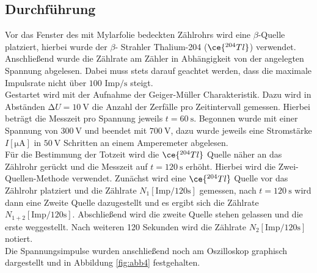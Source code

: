\subsection{Durchführung}
Vor das Fenster des mit Mylarfolie bedeckten Zählrohrs wird eine $\beta$-Quelle platziert, hierbei wurde der $\beta$- Strahler Thalium-204 ($\ce{^{204}_{}Tl}$) verwendet. Anschließend wurde die Zählrate
am Zähler in Abhängigkeit von der angelegten Spannung abgelesen. Dabei muss stets darauf geachtet werden, dass die maximale Impulsrate nicht über $100$ $\text{Imp}/{\si{\second}}$ steigt. %
\newline
\\
Gestartet wird mit der Aufnahme der Geiger-Müller Charakteristik. Dazu wird in Abständen $\increment U = \SI{10}{\volt}$ die Anzahl der Zerfälle pro Zeitintervall gemessen. Hierbei beträgt die
Messzeit pro Spannung jeweils $t = \SI{60}{\second}$.
Begonnen wurde mit einer Spannung
von $\SI{300}{\volt}$ und beendet mit $\SI{700}{\volt}$, dazu wurde jeweils eine Stromstärke $I [\si{\micro\ampere}]$ in $\SI{50}{\volt}$ Schritten an einem Amperemeter abgelesen. 
\newline
\\
Für die Bestimmung der Totzeit wird die $\ce{^{204}_{}Tl}$ Quelle näher an das Zählrohr gerückt und die Messzeit auf $t = \SI{120}{\second}$ erhöht. Hierbei wird die Zwei-Quellen-Methode %
verwendet. Zunächst wird eine $\ce{^{204}_{}Tl}$ Quelle vor das Zählrohr platziert und die Zählrate $N_{1} [\text{Imp}/120{\si{\second}}]$ gemessen, nach $t = \SI{120}{\second}$ wird dann eine Zweite Quelle 
dazugestellt und es ergibt sich die Zählrate $N_{1+2} [\text{Imp}/120{\si{\second}}]$. Abschließend wird die zweite Quelle stehen gelassen und die erste weggestellt. Nach weiteren 120 Sekunden wird
die Zählrate  $N_{2} [\text{Imp}/120{\si{\second}}]$ notiert.
\newline
\\
Die Spannungsimpulse wurden anschließend noch am Oszilloskop graphisch dargestellt und in Abbildung \ref{fig:abb4} festgehalten.